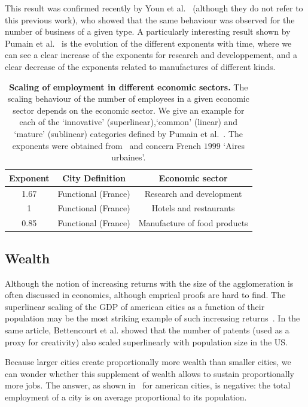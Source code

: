 This result was confirmed recently by Youn et al.~\cite{Youn:2014} (although
they do not refer to this previous work), who showed that the same behaviour was
observed for the number of business of a given type. A particularly interesting
result shown by Pumain et al.~\cite{Pumain:2006} is the evolution of the
different exponents with time, where we can see a clear increase of the
exponents for research and developpement, and a clear decrease of the exponents
related to manufactures of different kinds.\\

\begin{table}[!h]
    \centering
\begin{tabular}{|ccc|}
\hline
Exponent & City Definition & Economic sector\\
\hline
1.67 & Functional (France) & Research and development\\
1 & Functional (France) & Hotels and restaurants \\
0.85 & Functional (France) & Manufacture of food products\\
\hline
\end{tabular}
\caption{{\bf Scaling of employment in different economic sectors.} The scaling
behaviour of the number of employees in a given economic sector depends on the
economic sector. We give an example for each of the `innovative'
(superlinear),`common' (linear) and `mature' (sublinear) categories defined by
Pumain et al.~\cite{Pumain:2006}. The exponents were obtained from~\cite{Pumain:2006} and concern
French $1999$ `Aires urbaines'.} 
\label{table:employment} 
\end{table}

\subsection{Wealth}
\label{sub:wealth}

Although the notion of increasing returns with the size of the agglomeration is
often discussed in economics, although emprical proofs are hard to find. The
superlinear scaling of the GDP of american cities as a function of their
population may be the most striking example of such increasing
returns~\cite{Bettencourt:2007}. In the same article, Bettencourt et al. showed
that the number of patents (used as a proxy for creativity) also scaled
superlinearly with population size in the US.

Because larger cities create proportionally more wealth than smaller cities, we
can wonder whether this supplement of wealth allows to sustain proportionally
more jobs. The answer, as shown in~\cite{Bettencourt:2014} for american cities,
is negative: the total employment of a city is on average proportional to its population.

